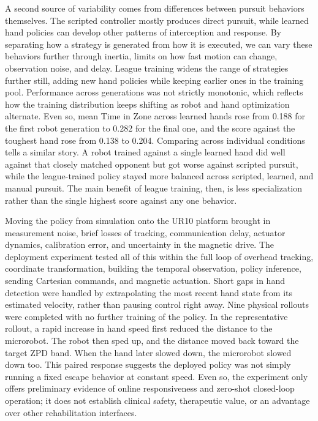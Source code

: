 \documentclass[letterpaper,journal]{IEEEtran}
\begin{document}
A second source of variability comes from differences between pursuit behaviors themselves. The scripted controller mostly produces direct pursuit, while learned hand policies can develop other patterns of interception and response. By separating how a strategy is generated from how it is executed, we can vary these behaviors further through inertia, limits on how fast motion can change, observation noise, and delay. League training widens the range of strategies further still, adding new hand policies while keeping earlier ones in the training pool. Performance across generations was not strictly monotonic, which reflects how the training distribution keeps shifting as robot and hand optimization alternate. Even so, mean Time in Zone across learned hands rose from 0.188 for the first robot generation to 0.282 for the final one, and the score against the toughest hand rose from 0.138 to 0.204. Comparing across individual conditions tells a similar story. A robot trained against a single learned hand did well against that closely matched opponent but got worse against scripted pursuit, while the league-trained policy stayed more balanced across scripted, learned, and manual pursuit. The main benefit of league training, then, is less specialization rather than the single highest score against any one behavior.

Moving the policy from simulation onto the UR10 platform brought in measurement noise, brief losses of tracking, communication delay, actuator dynamics, calibration error, and uncertainty in the magnetic drive. The deployment experiment tested all of this within the full loop of overhead tracking, coordinate transformation, building the temporal observation, policy inference, sending Cartesian commands, and magnetic actuation. Short gaps in hand detection were handled by extrapolating the most recent hand state from its estimated velocity, rather than pausing control right away. Nine physical rollouts were completed with no further training of the policy. In the representative rollout, a rapid increase in hand speed first reduced the distance to the microrobot. The robot then sped up, and the distance moved back toward the target ZPD band. When the hand later slowed down, the microrobot slowed down too. This paired response suggests the deployed policy was not simply running a fixed escape behavior at constant speed. Even so, the experiment only offers preliminary evidence of online responsiveness and zero-shot closed-loop operation; it does not establish clinical safety, therapeutic value, or an advantage over other rehabilitation interfaces.
\end{document}
